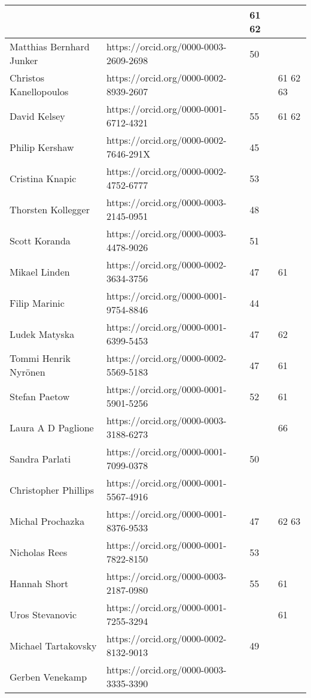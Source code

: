 \begin{center}
\begin{longtable}{|p{5cm}|C{6cm}|C{2cm}|C{2.5cm}|}
&
&61 62\\
\hline
Matthias Bernhard Junker
&https://orcid.org/0000-0003-2609-2698
&50
&\\
\hline
Christos Kanellopoulos
&https://orcid.org/0000-0002-8939-2607
&
&61 62 63\\
\hline
David Kelsey
&https://orcid.org/0000-0001-6712-4321
&55
&61 62\\
\hline
Philip Kershaw
&https://orcid.org/0000-0002-7646-291X
&45
&\\
\hline
Cristina Knapic
&https://orcid.org/0000-0002-4752-6777
&53
&\\
\hline
Thorsten Kollegger
&https://orcid.org/0000-0003-2145-0951
&48
&\\
\hline
Scott Koranda
&https://orcid.org/0000-0003-4478-9026
&51
&\\
\hline
Mikael Linden
&https://orcid.org/0000-0002-3634-3756
&47
&61\\
\hline
Filip Marinic
&https://orcid.org/0000-0001-9754-8846
&44
&\\
\hline
Ludek Matyska
&https://orcid.org/0000-0001-6399-5453
&47
&62\\
\hline
Tommi Henrik Nyr\"{o}nen
&https://orcid.org/0000-0002-5569-5183
&47
&61\\
\hline
Stefan Paetow
&https://orcid.org/0000-0001-5901-5256
&52
&61\\
\hline
Laura A D Paglione
&https://orcid.org/0000-0003-3188-6273
&
&66\\
\hline
Sandra Parlati
&https://orcid.org/0000-0001-7099-0378
&50
&\\
\hline
Christopher Phillips
&https://orcid.org/0000-0001-5567-4916
&
&\\
\hline
Michal Prochazka
&https://orcid.org/0000-0001-8376-9533
&47
&62 63\\
\hline
Nicholas Rees
&https://orcid.org/0000-0001-7822-8150
&53
&\\
\hline
Hannah Short
&https://orcid.org/0000-0003-2187-0980
&55
&61\\
\hline
Uros Stevanovic
&https://orcid.org/0000-0001-7255-3294
&
&61\\
\hline
Michael Tartakovsky
&https://orcid.org/0000-0002-8132-9013
&49
&\\
\hline
Gerben Venekamp
&https://orcid.org/0000-0003-3335-3390

\end{longtable}
\end{center}
